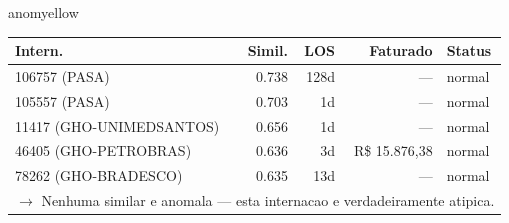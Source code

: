 \documentclass[a4paper,10pt]{article}
\begin{document}
\begin{anomalycard}[Internacao 14296 | GHO-PETROBRAS | MODERADO (z=2.20)]{anomyellow}
\begin{tabular}{l r r r l}\toprule\textbf{Intern.} & \textbf{Simil.} & \textbf{LOS} & \textbf{Faturado} & \textbf{Status} \\\midrule
106757 (PASA) & 0.738 & 128d & --- & \textcolor{jcubeblue}{normal} \\
105557 (PASA) & 0.703 & 1d & --- & \textcolor{jcubeblue}{normal} \\
11417 (GHO-UNIMEDSANTOS) & 0.656 & 1d & --- & \textcolor{jcubeblue}{normal} \\
46405 (GHO-PETROBRAS) & 0.636 & 3d & R\$ 15.876,38 & \textcolor{jcubeblue}{normal} \\
78262 (GHO-BRADESCO) & 0.635 & 13d & --- & \textcolor{jcubeblue}{normal} \\
\multicolumn{5}{l}{\textcolor{jcubeblue}{\small $\rightarrow$ Nenhuma similar e anomala --- esta internacao e verdadeiramente atipica.}} \\
\bottomrule\end{tabular}


\end{anomalycard}

\newpage
\end{document}
